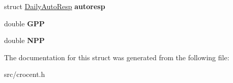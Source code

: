 \begin{DoxyCompactItemize}
\item 
\hypertarget{structmiscanthus_ab7a5c8c908b4f35863d70476411347e5}{struct \hyperlink{struct_daily_auto_resp}{Daily\-Auto\-Resp} {\bfseries autoresp}}\label{structmiscanthus_ab7a5c8c908b4f35863d70476411347e5}

\item 
\hypertarget{structmiscanthus_a00226e858ee9326304c8ce875f12aaec}{double {\bfseries G\-P\-P}}\label{structmiscanthus_a00226e858ee9326304c8ce875f12aaec}

\item 
\hypertarget{structmiscanthus_af0e313fa6321427e20c3884ee5516fc5}{double {\bfseries N\-P\-P}}\label{structmiscanthus_af0e313fa6321427e20c3884ee5516fc5}

\end{DoxyCompactItemize}


The documentation for this struct was generated from the following file\-:\begin{DoxyCompactItemize}
\item 
src/crocent.\-h\end{DoxyCompactItemize}
